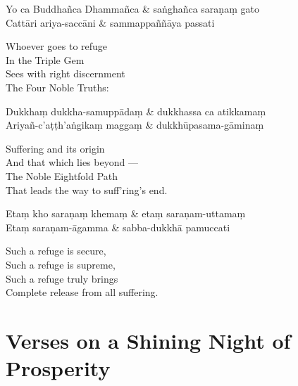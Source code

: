 \begin{twochants}
  Yo ca Buddhañca Dhammañca & saṅghañca saraṇaṃ gato \\
  Cattāri ariya-saccāni & sammappaññāya passati \\
\end{twochants}

\begin{english}
  Whoever goes to refuge\\
  In the Triple Gem\\
  Sees with right discernment\\
  The Four Noble Truths:
\end{english}

\begin{twochants}
  Dukkhaṃ dukkha-samuppādaṃ & dukkhassa ca atikkamaṃ \\
  Ariyañ-c'aṭṭh'aṅgikaṃ maggaṃ & dukkhūpasama-gāminaṃ \\
\end{twochants}

\begin{english}
  Suffering and its origin\\
  And that which lies beyond ---\\
  The Noble Eightfold Path\\
  That leads the way to suff'ring's end.
\end{english}

\begin{twochants}
  Etaṃ kho saraṇaṃ khemaṃ & etaṃ saraṇam-uttamaṃ \\
  Etaṃ saraṇam-āgamma & sabba-dukkhā pamuccati \\
\end{twochants}

\begin{english}
  Such a refuge is secure,\\
  Such a refuge is supreme,\\
  Such a refuge truly brings\\
  Complete release from all suffering.
\end{english}


\section{Verses on a Shining Night of Prosperity}

\begin{leader}
\end{leader}

